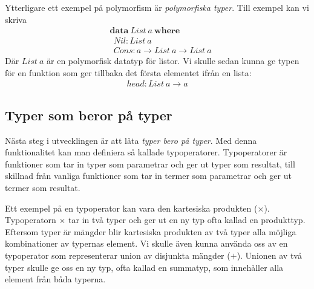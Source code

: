 Ytterligare ett exempel på polymorfism är \emph{polymorfiska typer}. Till
exempel kan vi skriva
\begin{align*}
  &\boldsymbol{data}\ List\ a\ \boldsymbol{where} \\
  &\ \ Nil : List\ a \\
  &\ \ Cons : a \to List\ a \to List\ a
\end{align*}
Där $List\ a$ är en polymorfisk datatyp för listor. Vi skulle sedan kunna ge
typen för en funktion som ger tillbaka det första elementet ifrån en lista:
\begin{align*}
  head : List\ a \to a
\end{align*}

\subsection{Typer som beror på typer}
Nästa steg i utvecklingen är att låta \emph{typer bero på typer}. Med denna
funktionalitet kan man definiera så kallade typoperatorer. Typoperatorer är
funktioner som tar in typer som parametrar och ger ut typer som resultat, till
skillnad från vanliga funktioner som tar in termer som parametrar och ger ut
termer som resultat.

Ett exempel på en typoperator kan vara den kartesiska produkten ($\times$).
Typoperatorn $\times$ tar in två typer och ger ut en ny typ ofta kallad en
produkttyp. Eftersom typer är mängder blir kartesiska produkten av två typer
alla möjliga kombinationer av typernas element. Vi skulle även kunna använda
oss av en typoperator som representerar union av disjunkta mängder ($+$).
Unionen av två typer skulle ge oss en ny typ, ofta kallad en summatyp, som
innehåller alla element från båda typerna.

